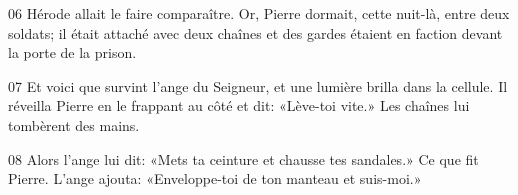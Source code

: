 
06 Hérode allait le faire comparaître. Or, Pierre dormait, cette nuit-là, entre deux soldats; il était attaché avec deux chaînes et des gardes étaient en faction devant la porte de la prison.

07 Et voici que survint l’ange du Seigneur, et une lumière brilla dans la cellule. Il réveilla Pierre en le frappant au côté et dit: «Lève-toi vite.» Les chaînes lui tombèrent des mains.

08 Alors l’ange lui dit: «Mets ta ceinture et chausse tes sandales.» Ce que fit Pierre. L’ange ajouta: «Enveloppe-toi de ton manteau et suis-moi.»
